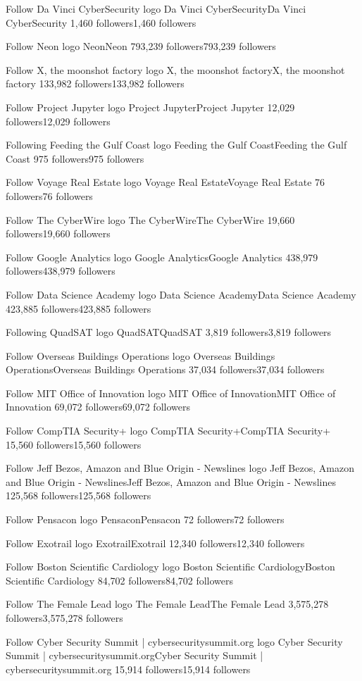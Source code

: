 Follow
Da Vinci CyberSecurity logo
Da Vinci CyberSecurityDa Vinci CyberSecurity
1,460 followers1,460 followers

Follow
Neon logo
NeonNeon
793,239 followers793,239 followers

Follow
X, the moonshot factory logo
X, the moonshot factoryX, the moonshot factory
133,982 followers133,982 followers

Follow
Project Jupyter logo
Project JupyterProject Jupyter
12,029 followers12,029 followers

Following
Feeding the Gulf Coast logo
Feeding the Gulf CoastFeeding the Gulf Coast
975 followers975 followers

Follow
Voyage Real Estate logo
Voyage Real EstateVoyage Real Estate
76 followers76 followers

Follow
The CyberWire logo
The CyberWireThe CyberWire
19,660 followers19,660 followers

Follow
Google Analytics logo
Google AnalyticsGoogle Analytics
438,979 followers438,979 followers

Follow
Data Science Academy logo
Data Science AcademyData Science Academy
423,885 followers423,885 followers

Following
QuadSAT logo
QuadSATQuadSAT
3,819 followers3,819 followers

Follow
Overseas Buildings Operations logo
Overseas Buildings OperationsOverseas Buildings Operations
37,034 followers37,034 followers

Follow
MIT Office of Innovation logo
MIT Office of InnovationMIT Office of Innovation
69,072 followers69,072 followers

Follow
CompTIA Security+ logo
CompTIA Security+CompTIA Security+
15,560 followers15,560 followers

Follow
Jeff Bezos, Amazon and Blue Origin - Newslines logo
Jeff Bezos, Amazon and Blue Origin - NewslinesJeff Bezos, Amazon and Blue Origin - Newslines
125,568 followers125,568 followers

Follow
Pensacon logo
PensaconPensacon
72 followers72 followers

Follow
Exotrail logo
ExotrailExotrail
12,340 followers12,340 followers

Follow
Boston Scientific Cardiology logo
Boston Scientific CardiologyBoston Scientific Cardiology
84,702 followers84,702 followers

Follow
The Female Lead logo
The Female LeadThe Female Lead
3,575,278 followers3,575,278 followers

Follow
Cyber Security Summit | cybersecuritysummit.org logo
Cyber Security Summit | cybersecuritysummit.orgCyber Security Summit | cybersecuritysummit.org
15,914 followers15,914 followers

